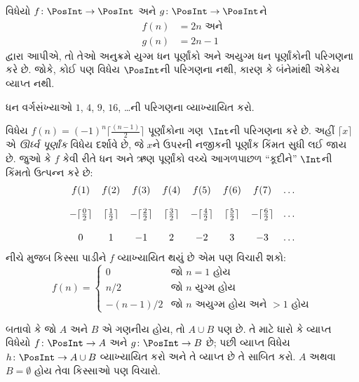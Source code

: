 \begin{ex}
વિધેયો $f\colon \PosInt \to \PosInt$ અને
$g \colon \PosInt \to
\PosInt$ને
\begin{align*}
f(n) & = 2n \text{ અને}\\
g(n) & = 2n - 1
\end{align*}
દ્વારા આપીએ, તો તેઓ અનુક્રમે યુગ્મ ધન પૂર્ણાંકો અને
અયુગ્મ ધન પૂર્ણાંકોની પરિગણના કરે છે. જોકે, કોઈ પણ
વિધેય $\PosInt$ની પરિગણના નથી, કારણ કે બંનેમાંથી
એકેય વ્યાપ્ત નથી.
\end{ex}

\begin{prob}
ધન વર્ગસંખ્યાઓ $1$, $4$, $9$, $16$, \dots{}ની
પરિગણના વ્યાખ્યાયિત કરો.
\end{prob}

\begin{ex}
વિધેય $f(n) = (-1)^{n} \lceil \frac{(n-1)}{2}\rceil$
પૂર્ણાંકોના ગણ~$\Int$ની પરિગણના કરે છે. અહીં
$\lceil x \rceil$ એ \emph{ઊર્ધ્વ પૂર્ણાંક} વિધેય
દર્શાવે છે, જે $x$ને ઉપરની નજીકની પૂર્ણાંક કિંમત
સુધી લઈ જાય છે. જુઓ કે $f$ કેવી રીતે ધન અને ઋણ
પૂર્ણાંકો વચ્ચે આગળપાછળ “કૂદીને” $\Int$ની કિંમતો
ઉત્પન્ન કરે છે:
\[
\begin{array}{c c c c c c c c}
f(1) & f(2) & f(3) & f(4) & f(5) & f(6) & f(7) & \dots \\ \\
- \lceil \tfrac{0}{2} \rceil & \lceil \tfrac{1}{2}\rceil & - \lceil \tfrac{2}{2} \rceil & \lceil \tfrac{3}{2} \rceil & - \lceil \tfrac{4}{2} \rceil  & \lceil \tfrac{5}{2}
\rceil & - \lceil \tfrac{6}{2} \rceil & \dots \\ \\
0 & 1 & -1 & 2 & -2 & 3 & -3 & \dots
\end{array}
\]
નીચે મુજબ કિસ્સા પાડીને $f$ વ્યાખ્યાયિત થયું છે
એમ પણ વિચારી શકો:
\[
f(n) = \begin{cases}
  0 & \text{જો $n = 1$ હોય}\\
  n/2 & \text{જો $n$ યુગ્મ હોય}\\
  -(n-1)/2 & \text{જો $n$ અયુગ્મ હોય અને $>1$ હોય}
  \end{cases}
\]
\end{ex}

\begin{prob}
બતાવો કે જો $A$ અને $B$ એ ગણનીય હોય,
તો $A \cup B$ પણ છે. તે માટે ધારો કે
વ્યાપ્ત વિધેયો $f\colon \PosInt \to
A$ અને $g\colon \PosInt \to B$ છે; પછી
વ્યાપ્ત વિધેય~$h\colon \PosInt \to A \cup B$
વ્યાખ્યાયિત કરો અને તે વ્યાપ્ત છે તે સાબિત કરો.
$A$ અથવા~$B = \emptyset$ હોય તેવા કિસ્સાઓ પણ વિચારો.
\end{prob}

